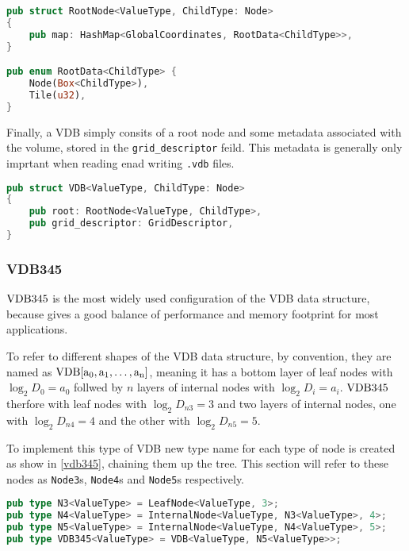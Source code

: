 \begin{lstlisting}[language=rust, captionpos=b, caption={
    \texttt{RootNode} definition. \texttt{RootData} is either a pointer to a child or a 4 bytes of data for a tile value.
  },label={code:root}]
pub struct RootNode<ValueType, ChildType: Node>
{
    pub map: HashMap<GlobalCoordinates, RootData<ChildType>>,
}

pub enum RootData<ChildType> {
    Node(Box<ChildType>),
    Tile(u32),
}
\end{lstlisting}

Finally, a VDB simply consits of a root node and some metadata associated with the volume, stored in the \verb|grid_descriptor| feild. This metadata is generally only imprtant when reading enad writing \verb|.vdb| files.

\begin{lstlisting}[language=rust, captionpos=b, caption={\texttt{VDB} definition}]
pub struct VDB<ValueType, ChildType: Node>
{
    pub root: RootNode<ValueType, ChildType>,
    pub grid_descriptor: GridDescriptor,
}
\end{lstlisting}

\subsubsection{VDB345}
$\rm{VDB}345$ is the most widely used configuration of the VDB data structure, because gives a good balance of performance and memory footprint for most applications.
\begin{sloppypar}
  To refer to different shapes of the VDB data structure, by convention, they are named as ${\rm{VDB}[a_{0},a_{1},\dots, a_{n}]}$, meaning it has a  bottom layer of leaf nodes with $\log_{2}D_{0}=a_{0}$ follwed by $n$ layers of internal nodes with $\log_{2}D_{i}=a_{i}$. $\rm{VDB}345$ therfore with leaf nodes with $\log_{2}D_{n3} = 3$ and two layers of internal nodes, one with $\log_{2}D_{n4} = 4$ and the other with $\log_{2}D_{n5} = 5$.
\end{sloppypar}

To implement this type of VDB new type name for each type of node is created as show in \cref{vdb345}, chaining them up the tree. This section will refer to these nodes as \texttt{Node3}s, \texttt{Node4}s and \texttt{Node5}s respectively.

\begin{lstlisting}[language=rust, captionpos=b, caption={\texttt{VDB345} definition}, label={vdb345}]
pub type N3<ValueType> = LeafNode<ValueType, 3>;
pub type N4<ValueType> = InternalNode<ValueType, N3<ValueType>, 4>;
pub type N5<ValueType> = InternalNode<ValueType, N4<ValueType>, 5>;
pub type VDB345<ValueType> = VDB<ValueType, N5<ValueType>>;
\end{lstlisting}

